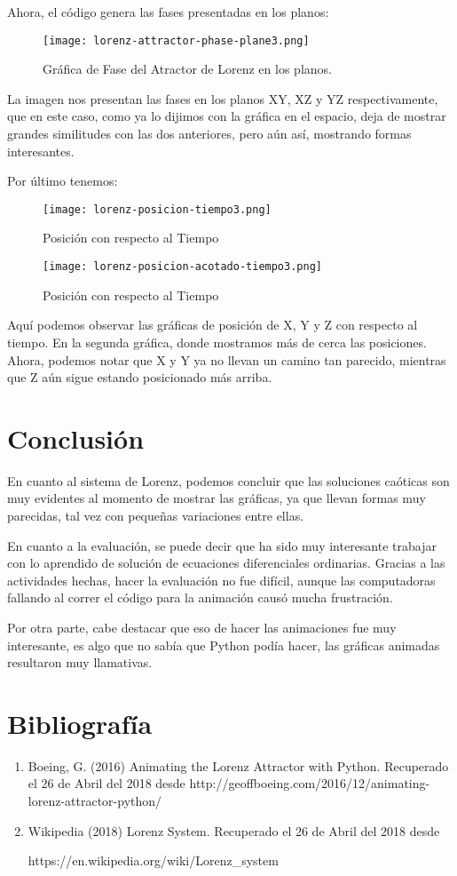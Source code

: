 \documentclass[a4paper]{article}
\begin{document}
Ahora, el código genera las fases presentadas en los planos:
\begin{figure}[h!]
  \centering
  \texttt{[image: lorenz-attractor-phase-plane3.png]}
   \caption{Gráfica de Fase del Atractor de Lorenz en los planos.}
\end{figure}

La imagen nos presentan las fases en los planos XY, XZ y YZ respectivamente, que en este caso, como ya lo dijimos con la gráfica en el espacio, deja de mostrar grandes similitudes con las dos anteriores, pero aún así, mostrando formas interesantes. 

Por último tenemos:

\begin{figure}[ht!]
  \centering
  \texttt{[image: lorenz-posicion-tiempo3.png]}
   \caption{Posición con respecto al Tiempo}
\end{figure}

\begin{figure}[ht!]
  \centering
  \texttt{[image: lorenz-posicion-acotado-tiempo3.png]}
  \caption{Posición con respecto al Tiempo}
\end{figure}

Aquí podemos observar las gráficas de posición de X, Y y Z con respecto al tiempo. En la segunda gráfica, donde mostramos más de cerca las posiciones. Ahora, podemos notar que X y Y ya no llevan un camino tan parecido, mientras que Z aún sigue estando posicionado más arriba. 

\section{Conclusión}
En cuanto al sistema de Lorenz, podemos concluir que las soluciones caóticas son muy evidentes al momento de mostrar las gráficas, ya que llevan formas muy parecidas, tal vez con pequeñas variaciones entre ellas.

En cuanto a la evaluación, se puede decir que ha sido muy interesante trabajar con lo aprendido de solución de ecuaciones diferenciales ordinarias. Gracias a las actividades hechas, hacer la evaluación no fue difícil, aunque las computadoras fallando al correr el código para la animación causó mucha frustración.

Por otra parte, cabe destacar que eso de hacer las animaciones fue muy interesante, es algo que no sabía que Python podía hacer, las gráficas  animadas resultaron muy llamativas.

\section{Bibliografía}
\begin{enumerate}
\item Boeing, G. (2016) Animating the Lorenz Attractor with Python. Recuperado el 26 de Abril del 2018 desde http://geoffboeing.com/2016/12/animating-lorenz-attractor-python/

\item Wikipedia (2018) Lorenz System. Recuperado el 26 de Abril del 2018 desde 

https://en.wikipedia.org/wiki/Lorenz\_system
\end{enumerate}
\end{document}
